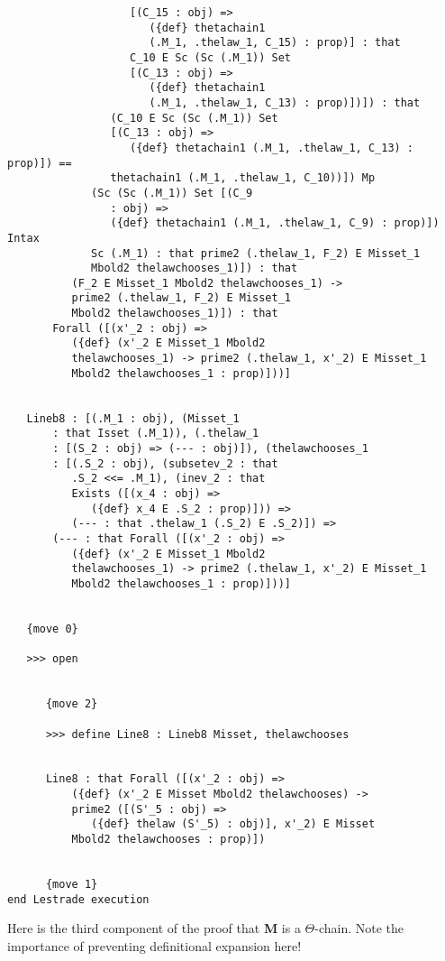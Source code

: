 \documentclass[12pt]{article}
\begin{document}
\begin{verbatim}
                   [(C_15 : obj) => 
                      ({def} thetachain1 
                      (.M_1, .thelaw_1, C_15) : prop)] : that 
                   C_10 E Sc (Sc (.M_1)) Set 
                   [(C_13 : obj) => 
                      ({def} thetachain1 
                      (.M_1, .thelaw_1, C_13) : prop)])]) : that 
                (C_10 E Sc (Sc (.M_1)) Set 
                [(C_13 : obj) => 
                   ({def} thetachain1 (.M_1, .thelaw_1, C_13) : prop)]) == 
                thetachain1 (.M_1, .thelaw_1, C_10))]) Mp 
             (Sc (Sc (.M_1)) Set [(C_9 
                : obj) => 
                ({def} thetachain1 (.M_1, .thelaw_1, C_9) : prop)]) Intax 
             Sc (.M_1) : that prime2 (.thelaw_1, F_2) E Misset_1 
             Mbold2 thelawchooses_1)]) : that 
          (F_2 E Misset_1 Mbold2 thelawchooses_1) -> 
          prime2 (.thelaw_1, F_2) E Misset_1 
          Mbold2 thelawchooses_1)]) : that 
       Forall ([(x'_2 : obj) => 
          ({def} (x'_2 E Misset_1 Mbold2 
          thelawchooses_1) -> prime2 (.thelaw_1, x'_2) E Misset_1 
          Mbold2 thelawchooses_1 : prop)]))]


   Lineb8 : [(.M_1 : obj), (Misset_1 
       : that Isset (.M_1)), (.thelaw_1 
       : [(S_2 : obj) => (--- : obj)]), (thelawchooses_1 
       : [(.S_2 : obj), (subsetev_2 : that 
          .S_2 <<= .M_1), (inev_2 : that 
          Exists ([(x_4 : obj) => 
             ({def} x_4 E .S_2 : prop)])) => 
          (--- : that .thelaw_1 (.S_2) E .S_2)]) => 
       (--- : that Forall ([(x'_2 : obj) => 
          ({def} (x'_2 E Misset_1 Mbold2 
          thelawchooses_1) -> prime2 (.thelaw_1, x'_2) E Misset_1 
          Mbold2 thelawchooses_1 : prop)]))]


   {move 0}

   >>> open


      {move 2}

      >>> define Line8 : Lineb8 Misset, thelawchooses


      Line8 : that Forall ([(x'_2 : obj) => 
          ({def} (x'_2 E Misset Mbold2 thelawchooses) -> 
          prime2 ([(S'_5 : obj) => 
             ({def} thelaw (S'_5) : obj)], x'_2) E Misset 
          Mbold2 thelawchooses : prop)])


      {move 1}
end Lestrade execution
\end{verbatim}

Here is the third component of the proof that {\bf M} is a $\Theta$-chain.  Note the importance of preventing definitional expansion here!
\end{document}
